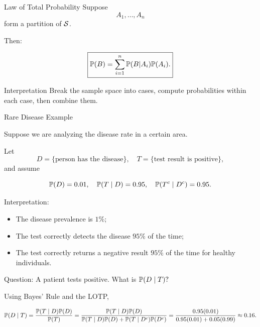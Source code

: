 \begin{frame}{Law of Total Probability}
Suppose
\[
A_1,\dots,A_n
\]
form a partition of $\mathcal{S}$.

Then:

\[
\boxed{
\mathbb{P}(B)
=
\sum_{i=1}^n
\mathbb{P}(B|A_i)\mathbb{P}(A_i).
}
\]

\vspace{0.25cm}

\begin{keybox}{Interpretation}
Break the sample space into cases, compute probabilities within each case, then combine them.
\end{keybox}
\end{frame}
\begin{frame}{Rare Disease Example}

Suppose we are analyzing the disease rate in a certain area. 

Let
\[
D=\{\text{person has the disease}\}, \quad T=\{\text{test result is positive}\},
\]
and assume

\[
\mathbb{P}(D)=0.01, \quad \mathbb{P}(T\mid D)=0.95, \quad  \mathbb{P}(T^c\mid D^c)=0.95.
\]


Interpretation:

\begin{itemize}
    \item The disease prevalence is $1\%$;
    \item The test correctly detects the disease $95\%$ of the time;
    \item The test correctly returns a negative result $95\%$ of the time for healthy individuals.
\end{itemize}

\vspace{0.2cm}

Question: A patient tests positive. What is $\mathbb{P}(D\mid T)?$

Using Bayes' Rule and the LOTP,

\[
\mathbb{P}(D\mid T)
=
\frac{\mathbb{P}(T\mid D)\mathbb{P}(D)}
{\mathbb{P}(T)} = \frac{\mathbb{P}(T\mid D)\mathbb{P}(D)}
{\mathbb{P}(T\mid D)\mathbb{P}(D)
+
\mathbb{P}(T\mid D^c)\mathbb{P}(D^c)} = \frac{0.95(0.01)}
{0.95(0.01)+0.05(0.99)}
\approx0.16.
\]
\end{frame}

